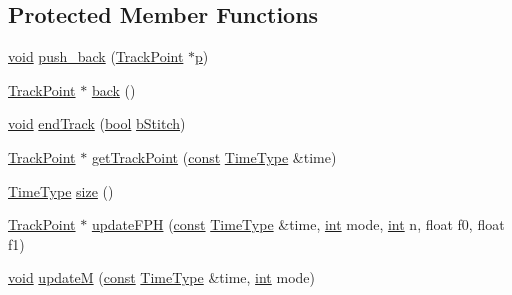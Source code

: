 \subsection*{Protected Member Functions}
\begin{DoxyCompactItemize}
\item 
\hyperlink{sound_8c_ae35f5844602719cf66324f4de2a658b3}{void} \hyperlink{class__sbsms___1_1_track_af489c795dd5d88178147b04080ac3cc2}{push\+\_\+back} (\hyperlink{class__sbsms___1_1_track_point}{Track\+Point} $\ast$\hyperlink{xmltok_8h_a94b60f3beb36ae85555d36dc9816769c}{p})
\item 
\hyperlink{class__sbsms___1_1_track_point}{Track\+Point} $\ast$ \hyperlink{class__sbsms___1_1_track_a20f737cba39bc3e100b448ae1a8ac703}{back} ()
\item 
\hyperlink{sound_8c_ae35f5844602719cf66324f4de2a658b3}{void} \hyperlink{class__sbsms___1_1_track_a10204078b96732e59317aadc32649639}{end\+Track} (\hyperlink{mac_2config_2i386_2lib-src_2libsoxr_2soxr-config_8h_abb452686968e48b67397da5f97445f5b}{bool} \hyperlink{class__sbsms___1_1_track_aa9742b1b2512119291b7bb97427765e9}{b\+Stitch})
\item 
\hyperlink{class__sbsms___1_1_track_point}{Track\+Point} $\ast$ \hyperlink{class__sbsms___1_1_track_af9bbb0ac61ee905bf1a1a1e808cfa364}{get\+Track\+Point} (\hyperlink{getopt1_8c_a2c212835823e3c54a8ab6d95c652660e}{const} \hyperlink{namespace__sbsms___a3a161c3deff71e932c0ec86aad54eb7c}{Time\+Type} \&time)
\item 
\hyperlink{namespace__sbsms___a3a161c3deff71e932c0ec86aad54eb7c}{Time\+Type} \hyperlink{class__sbsms___1_1_track_a47ef00513d6b838f81eecda603edb11d}{size} ()
\item 
\hyperlink{class__sbsms___1_1_track_point}{Track\+Point} $\ast$ \hyperlink{class__sbsms___1_1_track_aa578a1efb91028b133d0b6ab72df97d3}{update\+F\+PH} (\hyperlink{getopt1_8c_a2c212835823e3c54a8ab6d95c652660e}{const} \hyperlink{namespace__sbsms___a3a161c3deff71e932c0ec86aad54eb7c}{Time\+Type} \&time, \hyperlink{xmltok_8h_a5a0d4a5641ce434f1d23533f2b2e6653}{int} mode, \hyperlink{xmltok_8h_a5a0d4a5641ce434f1d23533f2b2e6653}{int} n, float f0, float f1)
\item 
\hyperlink{sound_8c_ae35f5844602719cf66324f4de2a658b3}{void} \hyperlink{class__sbsms___1_1_track_a8a3d7fdb6ca6fcfdabdc234ccb8ee91b}{updateM} (\hyperlink{getopt1_8c_a2c212835823e3c54a8ab6d95c652660e}{const} \hyperlink{namespace__sbsms___a3a161c3deff71e932c0ec86aad54eb7c}{Time\+Type} \&time, \hyperlink{xmltok_8h_a5a0d4a5641ce434f1d23533f2b2e6653}{int} mode)

\end{DoxyCompactItemize}
